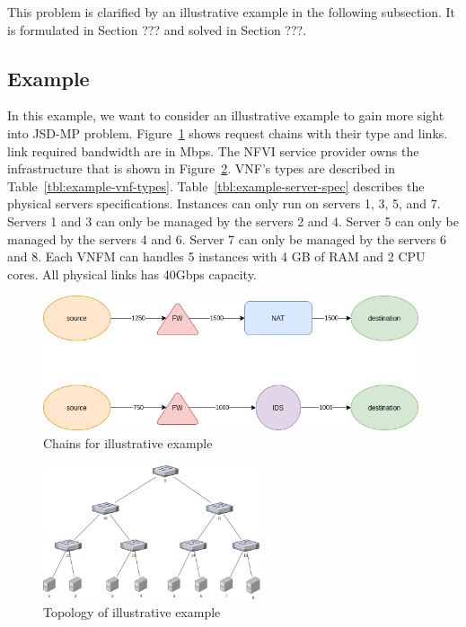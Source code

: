 This problem is clarified by an illustrative example in the following subsection.
It is formulated in Section ??? and solved in Section ???.

\subsection{Example}
\par
{}
In this example, we want to consider an illustrative example to gain more sight into JSD-MP problem.
Figure~\ref{fig:example-chains} shows request chains with their type and links. link required bandwidth are in Mbps.
The NFVI service provider owns the infrastructure that is shown in Figure~\ref{fig:example-topology}.
VNF's types are described in Table~\ref{tbl:example-vnf-types}.
Table~\ref{tbl:example-server-spec} describes the physical servers specifications.
Instances can only run on servers 1, 3, 5, and 7.
Servers 1 and 3 can only be managed by the servers 2 and 4.
Server 5 can only be managed by the servers 4 and 6.
Server 7 can only be managed by the servers 6 and 8.
Each VNFM can handles 5 instances with 4 GB of RAM and 2 CPU cores.
All physical links has 40Gbps capacity.

\begin{figure}
    \centering
    \includegraphics[height=150px]{images/example-chains.png}
    \caption{Chains for illustrative example}
    \label{fig:example-chains}
\end{figure}

\begin{figure}
    \centering
    \includegraphics[height=150px]{images/example-toplogy.png}
    \caption{Topology of illustrative example}
    \label{fig:example-topology}
\end{figure}

